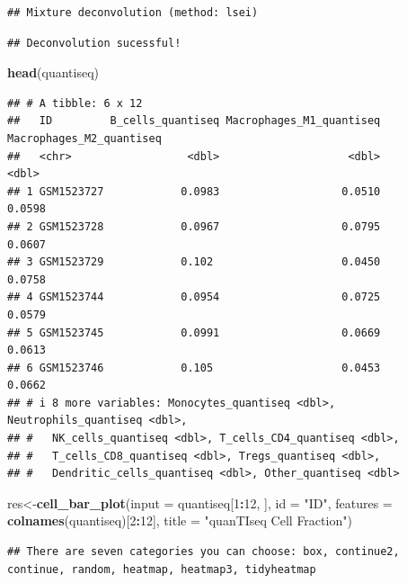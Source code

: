 \documentclass[
  12pt,
]{book}
\newenvironment{Shaded}{\begin{snugshade}}{\end{snugshade}}
\newcommand{\AttributeTok}[1]{\textcolor[rgb]{0.13,0.29,0.53}{#1}}
\newcommand{\DecValTok}[1]{\textcolor[rgb]{0.00,0.00,0.81}{#1}}
\newcommand{\FunctionTok}[1]{\textcolor[rgb]{0.13,0.29,0.53}{\textbf{#1}}}
\newcommand{\NormalTok}[1]{#1}
\newcommand{\OtherTok}[1]{\textcolor[rgb]{0.56,0.35,0.01}{#1}}
\newcommand{\SpecialCharTok}[1]{\textcolor[rgb]{0.81,0.36,0.00}{\textbf{#1}}}
\newcommand{\StringTok}[1]{\textcolor[rgb]{0.31,0.60,0.02}{#1}}
\begin{document}
\begin{verbatim}
## Mixture deconvolution (method: lsei)
\end{verbatim}

\begin{verbatim}
## Deconvolution sucessful!
\end{verbatim}

\begin{Shaded}
\begin{Highlighting}[]
\FunctionTok{head}\NormalTok{(quantiseq)}
\end{Highlighting}
\end{Shaded}

\begin{verbatim}
## # A tibble: 6 x 12
##   ID         B_cells_quantiseq Macrophages_M1_quantiseq Macrophages_M2_quantiseq
##   <chr>                  <dbl>                    <dbl>                    <dbl>
## 1 GSM1523727            0.0983                   0.0510                   0.0598
## 2 GSM1523728            0.0967                   0.0795                   0.0607
## 3 GSM1523729            0.102                    0.0450                   0.0758
## 4 GSM1523744            0.0954                   0.0725                   0.0579
## 5 GSM1523745            0.0991                   0.0669                   0.0613
## 6 GSM1523746            0.105                    0.0453                   0.0662
## # i 8 more variables: Monocytes_quantiseq <dbl>, Neutrophils_quantiseq <dbl>,
## #   NK_cells_quantiseq <dbl>, T_cells_CD4_quantiseq <dbl>,
## #   T_cells_CD8_quantiseq <dbl>, Tregs_quantiseq <dbl>,
## #   Dendritic_cells_quantiseq <dbl>, Other_quantiseq <dbl>
\end{verbatim}

\begin{Shaded}
\begin{Highlighting}[]
\NormalTok{res}\OtherTok{\textless{}{-}}\FunctionTok{cell\_bar\_plot}\NormalTok{(}\AttributeTok{input =}\NormalTok{ quantiseq[}\DecValTok{1}\SpecialCharTok{:}\DecValTok{12}\NormalTok{, ], }\AttributeTok{id =} \StringTok{"ID"}\NormalTok{, }\AttributeTok{features =} \FunctionTok{colnames}\NormalTok{(quantiseq)[}\DecValTok{2}\SpecialCharTok{:}\DecValTok{12}\NormalTok{], }\AttributeTok{title =} \StringTok{"quanTIseq Cell Fraction"}\NormalTok{)}
\end{Highlighting}
\end{Shaded}

\begin{verbatim}
## There are seven categories you can choose: box, continue2, continue, random, heatmap, heatmap3, tidyheatmap
\end{verbatim}
\end{document}
